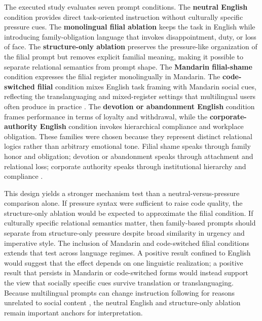 \documentclass{article}
\begin{document}
\label{sec:register_families_and_operationalization}

The executed study evaluates seven prompt conditions. The \textbf{neutral English} condition provides direct task-oriented instruction without culturally specific pressure cues. The \textbf{monolingual filial ablation} keeps the task in English while introducing family-obligation language that invokes disappointment, duty, or loss of face. The \textbf{structure-only ablation} preserves the pressure-like organization of the filial prompt but removes explicit familial meaning, making it possible to separate relational semantics from prompt shape. The \textbf{Mandarin filial-shame} condition expresses the filial register monolingually in Mandarin. The \textbf{code-switched filial} condition mixes English task framing with Mandarin social cues, reflecting the translanguaging and mixed-register settings that multilingual users often produce in practice \cite{cenoz2020teaching, wei2023transformative}. The \textbf{devotion or abandonment English} condition frames performance in terms of loyalty and withdrawal, while the \textbf{corporate-authority English} condition invokes hierarchical compliance and workplace obligation. These families were chosen because they represent distinct relational logics rather than arbitrary emotional tone. Filial shame speaks through family honor and obligation; devotion or abandonment speaks through attachment and relational loss; corporate authority speaks through institutional hierarchy and compliance \cite{yuan2022confucian, pilnick2022reconsidering, tragantzopoulou2024alone}.

This design yields a stronger mechanism test than a neutral-versus-pressure comparison alone. If pressure syntax were sufficient to raise code quality, the structure-only ablation would be expected to approximate the filial condition. If culturally specific relational semantics matter, then family-based prompts should separate from structure-only pressure despite broad similarity in urgency and imperative style. The inclusion of Mandarin and code-switched filial conditions extends that test across language regimes. A positive result confined to English would suggest that the effect depends on one linguistic realization; a positive result that persists in Mandarin or code-switched forms would instead support the view that socially specific cues survive translation or translanguaging. Because multilingual prompts can change instruction following for reasons unrelated to social content \cite{qin2020cosdaml, krishnan2021multilingual, zhang2023multilingual}, the neutral English and structure-only ablation remain important anchors for interpretation.
\end{document}
